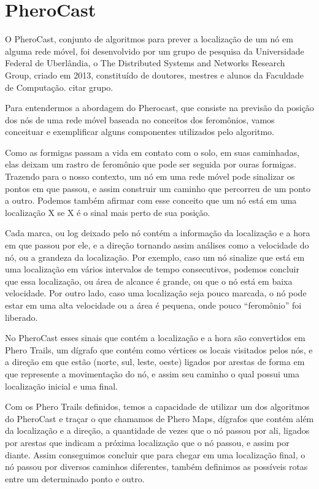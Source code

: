 \documentclass[12pt, %
openright, 
oneside,
a4paper,
brazil]{facom-ufu-abntex2}
\begin{document}
\section{PheroCast}

	O PheroCast, conjunto de algoritmos para prever a localização de um nó em alguma rede móvel, foi desenvolvido por um grupo de pesquisa da Universidade Federal de Uberlândia, o The Distributed Systems and Networks  Research Group, criado em 2013, constituído de doutores, mestres e alunos da Faculdade de Computação. citar grupo. 
	
	
	Para entendermos a abordagem do Pherocast, que consiste na previsão da posição dos nós de uma rede móvel baseada no conceitos dos feromônios, vamos conceituar e exemplificar alguns componentes utilizados pelo algoritmo.

	Como as formigas passam a vida em contato com o solo, em suas caminhadas, elas deixam um rastro de feromônio que pode ser seguida por ouras formigas. Trazendo para o nosso contexto, um nó em uma rede móvel pode sinalizar os pontos em que passou, e assim construir um caminho que percorreu de um ponto a outro. Podemos também afirmar com esse conceito que um nó está em uma localização X se X é o sinal mais perto de sua posição.
	
	Cada marca, ou log deixado pelo nó contém a informação da localização e a hora em que passou por ele, e a direção tornando assim análises como a velocidade do nó, ou a grandeza da localização. Por exemplo, caso um nó sinalize que está em uma localização em vários intervalos de tempo consecutivos, podemos concluir que essa localização, ou área de alcance é grande, ou que o nó está em baixa velocidade. Por outro lado, caso uma localização seja pouco marcada, o nó pode estar em uma alta velocidade ou a área é pequena, onde pouco ``feromônio'' foi liberado.\cite{6838650} 
	
	No PheroCast esses sinais que contém a localização e a hora são convertidos em Phero Trails, um dígrafo que contém como vértices os locais visitados pelos nós, e a direção em que estão (norte, sul, leste, oeste) ligados  por arestas de forma em que represente a movimentação do nó, e assim seu caminho o qual possui uma localização inicial e uma final.\cite{6838650} 
	
	Com os Phero Trails definidos, temos a capacidade de utilizar um dos algoritmos do PheroCast e traçar o que chamamos de Phero Maps, dígrafos que contém além da localização e a direção, a quantidade de vezes que o nó passou por ali, ligados por arestas que indicam a próxima localização que o nó passou, e assim por diante. Assim conseguimos concluir que para chegar em uma localização final, o nó passou por diversos caminhos diferentes, também definimos as possíveis rotas entre um determinado ponto e outro.\cite{6838650} 
	
\end{document}
